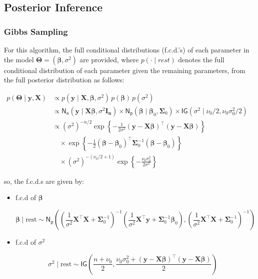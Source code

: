 \subsection{Posterior Inference}

\subsubsection{Gibbs Sampling}

For this algorithm, the full conditional distributions (f.c.d.'s) of each parameter in the model $\bm{\Theta} = (\bm{\beta}, \sigma^2)$ are provided, where $p(\cdot \mid \textit{rest})$ denotes the full conditional distribution of each parameter given the remaining parameters, from the full posterior distribution as follows:

\begin{equation}
    \label{POST_LRM}
    \begin{split}
    p(\bm{\Theta} \mid \bm{y}, \bm{X}) 
    &\propto 
p(\bm{y} \mid \bm{X}, \bm{\beta}, \sigma^2) \,
p(\bm{\beta} ) \,
p(\sigma^2 )\\
&\propto\mathsf{N_n}\left(\bm{y}\mid\bm{X}\bm{\beta},\sigma^2\bm{I_n}\right)\times\mathsf{N_p}(\bm{\beta}\mid\bm{\beta}_0, \bm{\Sigma}_0)\times\mathsf{IG}\left(\sigma^2\mid\nu_0/ 2, \nu_0 \sigma_0^2 / 2\right)\\
&\propto (\sigma^2)^{-n/2} 
\exp\left\{ -\frac{1}{2\sigma^2}  (\bm{y} - \bm{X} \bm{\beta})^{\top}
(\bm{y} - \bm{X} \bm{\beta}) \right\} \\
&\quad \times \exp\left\{ -\frac{1}{2} (\bm{\beta} - \bm{\beta}_0)^{\top}
\bm{\Sigma}_0^{-1} (\bm{\beta} - \bm{\beta}_0) \right\} \\
&\quad \times (\sigma^2)^{-(\nu_0/2 + 1)} 
\exp\left\{ -\frac{\nu_0 \sigma_0^2}{2\sigma^2} \right\}
\end{split}
\end{equation}

so, the f.c.d.s are given by:

\begin{itemize}

\item f.c.d of $\bm{\beta}$

\begin{equation}
    \label{LRM_MCMC_Beta}
    \bm{\beta} \mid \text{rest} \sim \mathsf{N_p}\left(\left( \frac{1}{\sigma^2} \bm{X}^\top \bm{X} + \bm{\Sigma}_0^{-1} \right)^{-1}\left( \frac{1}{\sigma^2} \bm{X}^\top \bm{y} + \bm{\Sigma}_0^{-1} \bm{\beta}_0 \right), \left( \frac{1}{\sigma^2} \bm{X}^\top \bm{X} + \bm{\Sigma}_0^{-1} \right)^{-1}\right)
\end{equation}

\item  f.c.d of $\sigma^2$

\begin{equation}
    \label{LRM_MCMC_sigma2}
    \sigma^2 \mid \text{rest} \sim \mathsf{IG}\left( \frac{n + \nu_0}{2}, \frac{\nu_0 \sigma_0^2 + (\bm{y} - \bm{X} \bm{\beta})^\top (\bm{y} - \bm{X} \bm{\beta})}{2} \right)
\end{equation}

\end{itemize}

